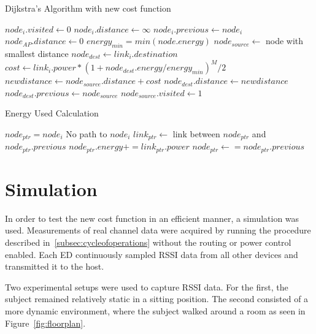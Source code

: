 \documentclass{article}
\begin{document}
\begin{algorithm}[!ht]
\caption{Dijkstra's Algorithm with new cost function}
\label{alg:dijkstra}
\begin{algorithmic}[1]
	\STATE $node_i.visited \leftarrow 0$
	\STATE $node_i.distance \leftarrow \infty$
	\STATE $node_i.previous \leftarrow node_i$
\ENDFOR
\STATE $node_{AP}.distance \leftarrow 0$
\STATE $energy_{min} = min(node.energy)$
	\STATE $node_{source} \leftarrow $ node with smallest distance
			\STATE $node_{dest} \leftarrow link_i.destination$
				\STATE $cost \leftarrow link_i.power * (1 + node_{dest}.energy/energy_{min} )^M/2$
				\STATE $newdistance \leftarrow node_{source}.distance + cost$
				\STATE$node_{dest}.distance \leftarrow newdistance$
				\STATE$node_{dest}.previous \leftarrow node_{source}$
				\ENDIF
			\ENDIF
		\ENDIF
	\ENDFOR
	\STATE $node_{source}.visited \leftarrow 1$
\ENDWHILE
\end{algorithmic}
\end{algorithm}

\begin{algorithm}[!ht]
\caption{Energy Used Calculation}
\label{alg:energyused}
\begin{algorithmic}[1]
	\STATE $node_{ptr} = node_i$
		\STATE No path to $node_i$
	\ELSE
			\STATE $link_{ptr} \leftarrow $ link between $node_{ptr}$ and $node_{ptr}.previous$
			\STATE $node_{ptr}.energy += link_{ptr}.power$
			\STATE $node_{ptr} \leftarrow = node_{ptr}.previous$
		\ENDWHILE
	\ENDIF
\ENDFOR
\end{algorithmic}
\end{algorithm}


\section{Simulation}\label{sec:simulation}
In order to test the new cost function in an efficient manner, a simulation was used. Measurements of real channel data were acquired by running the procedure described in~\ref{subsec:cycleofoperations} without the routing or power control enabled. Each ED continuously sampled RSSI data from all other devices and transmitted it to the host. 

Two experimental setups were used to capture RSSI data. For the first, the subject remained relatively static in a sitting position. The second consisted of a more dynamic environment, where the subject walked around a room as seen in Figure~\ref{fig:floorplan}. 
\end{document}
